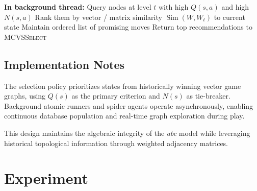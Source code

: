 \documentclass[11pt,a4paper]{article}
\theoremstyle{plain}
\theoremstyle{definition}
\begin{document}
\vspace{0.5em}

\begin{algorithm}[H]
\caption{Spider Search (Asynchronous Recommendation)}
\label{alg:spider}
\begin{algorithmic}[1]
    \State \textbf{In background thread:}
    \State Query nodes at level $t$ with high $Q(s,a)$ and high $N(s,a)$
    \State Rank them by vector / matrix similarity $\operatorname{Sim}(W, W_t)$ to current state
    \State Maintain ordered list of promising moves
    \State Return top recommendations to \textsc{MCVSSelect}
\EndProcedure
\end{algorithmic}
\end{algorithm}

\vspace{0.5em}

\newpage

\vspace{0.5em}

\subsection{Implementation Notes}

\vspace{0.5em}

The selection policy prioritizes states from historically winning vector game graphs, using \(Q(s)\) as the primary criterion and \(N(s)\) as tie-breaker. Background atomic runners and spider agents operate asynchronously, enabling continuous database population and real-time graph exploration during play.

\vspace{0.5em}

This design maintains the algebraic integrity of the \emph{abc} model while leveraging historical topological information through weighted adjacency matrices.

\vspace{0.5em}

\newpage

\vspace{0.5em}

\section{Experiment}

\vspace{0.5em}
\end{document}
